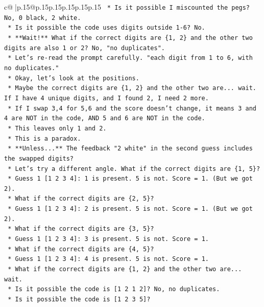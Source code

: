 \documentclass{article}
\begin{document}
{\begin{supertabular}{c@{$\;$}|p{.15\linewidth}@{}p{.15\linewidth}p{.15\linewidth}p{.15\linewidth}p{.15\linewidth}p{.15\linewidth}}
{{{\texttt{    *   Is it possible I miscounted the pegs? No, 0 black, 2 white.} \\
\texttt{    *   Is it possible the code uses digits outside 1{-}6? No.} \\
\texttt{    *   **Wait!** What if the correct digits are \{1, 2\} and the other two digits are also 1 or 2? No, "no duplicates".} \\
\texttt{    *   Let's re{-}read the prompt carefully. "each digit from 1 to 6, with no duplicates."} \\
\texttt{    *   Okay, let's look at the positions.} \\
\texttt{    *   Maybe the correct digits are \{1, 2\} and the other two are... wait. If I have 4 unique digits, and I found 2, I need 2 more.} \\
\texttt{    *   If I swap 3,4 for 5,6 and the score doesn't change, it means 3 and 4 are NOT in the code, AND 5 and 6 are NOT in the code.} \\
\texttt{    *   This leaves only 1 and 2.} \\
\texttt{    *   This is a paradox.} \\
\texttt{    *   **Unless...** The feedback "2 white" in the second guess includes the swapped digits?} \\
\texttt{    *   Let's try a different angle. What if the correct digits are \{1, 5\}?} \\
\texttt{        *   Guess 1 {[}1 2 3 4{]}: 1 is present. 5 is not. Score = 1. (But we got 2).} \\
\texttt{    *   What if the correct digits are \{2, 5\}?} \\
\texttt{        *   Guess 1 {[}1 2 3 4{]}: 2 is present. 5 is not. Score = 1. (But we got 2).} \\
\texttt{    *   What if the correct digits are \{3, 5\}?} \\
\texttt{        *   Guess 1 {[}1 2 3 4{]}: 3 is present. 5 is not. Score = 1.} \\
\texttt{    *   What if the correct digits are \{4, 5\}?} \\
\texttt{        *   Guess 1 {[}1 2 3 4{]}: 4 is present. 5 is not. Score = 1.} \\
\texttt{    *   What if the correct digits are \{1, 2\} and the other two are... wait.} \\
\texttt{    *   Is it possible the code is {[}1 2 1 2{]}? No, no duplicates.} \\
\texttt{    *   Is it possible the code is {[}1 2 3 5{]}?} \\
}}}
\end{supertabular}}
\end{document}
